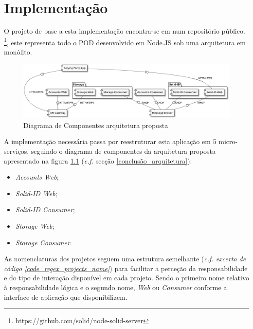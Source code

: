 
\chapter{Implementação}
\label{cap:5}

O projeto de base a esta implementação encontra-se em num repositório público. \footnote{https://github.com/solid/node-solid-server}, este representa todo o POD desenvolvido em Node.JS sob uma arquitetura em monólito.

\begin{figure}[h]
    \begin{center}
    \includegraphics[width=1 \textwidth]{figures/arquitetura_2_diagrama_componentes.eps}
    \caption{Diagrama de Componentes arquitetura proposta}
    \label{implementacao_arquitetura_2_diagrama_componentes}
    \end{center}
\end{figure}

A implementação necessária passa por reestruturar esta aplicação em 5 micro-serviços, seguindo o diagrama de componentes da arquitetura proposta apresentado na figura \ref{implementacao_arquitetura_2_diagrama_componentes}  (\emph{c.f.} secção \ref{conclusão_arquitetura}):
\begin{itemize}
    \item \emph{Accounts Web};
    \item \emph{Solid-ID Web};
    \item \emph{Solid-ID Consumer};
    \item \emph{Storage Web};
    \item \emph{Storage Consumer}.
\end{itemize}

As nomenclaturas dos projetos seguem uma estrutura semelhante (\emph{c.f. excerto de código \ref{code_regex_projects_name}}) para facilitar a perceção da responsabilidade e do tipo de interação disponível em cada projeto. Sendo o primeiro nome relativo à responsabilidade lógica e o segundo nome, \emph{Web} ou \emph{Consumer} conforme a interface de aplicação que disponibilizem.

